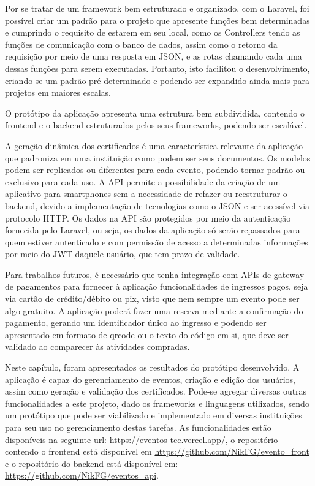 Por se tratar de um framework bem estruturado e organizado, com o Laravel, foi possível criar um padrão para o projeto que apresente funções bem determinadas e cumprindo o requisito de estarem em seu local, como os Controllers tendo as funções de comunicação com o banco de dados, assim como o retorno da requisição por meio de uma resposta em JSON, e as rotas chamando cada uma dessas funções para serem executadas. Portanto, isto facilitou o desenvolvimento, criando-se um padrão pré-determinado e podendo ser expandido ainda mais para projetos em maiores escalas.

O protótipo da aplicação apresenta uma estrutura bem subdividida, contendo o frontend e o backend estruturados pelos seus frameworks, podendo ser escalável.

A geração dinâmica dos certificados é uma característica relevante da aplicação que padroniza em uma instituição como podem ser seus documentos. Os modelos podem ser replicados ou diferentes para cada evento, podendo tornar padrão ou exclusivo para cada uso. A API permite a possibilidade da criação de um aplicativo para smartphones sem a necessidade de refazer ou reestruturar o backend, devido a implementação de tecnologias como o JSON e ser acessível via protocolo HTTP. Os dados na API são protegidos por meio da autenticação fornecida pelo Laravel, ou seja, os dados da aplicação só serão repassados para quem estiver autenticado e com permissão de acesso a determinadas informações por meio do JWT daquele usuário, que tem prazo de validade. 

Para trabalhos futuros, é necessário que tenha integração com APIs de gateway de pagamentos para fornecer à aplicação funcionalidades de ingressos pagos, seja via cartão de crédito/débito ou pix, visto que nem sempre um evento pode ser algo gratuito. A aplicação poderá fazer uma reserva mediante a confirmação do pagamento, gerando um identificador único ao ingresso e podendo ser apresentado em formato de qrcode ou o texto do código em si, que deve ser validado ao comparecer às atividades compradas. 

Neste capítulo, foram apresentados os resultados do protótipo desenvolvido. A aplicação é capaz do gerenciamento de eventos, criação e edição dos usuários, assim como geração e validação dos certificados. Pode-se agregar diversas outras funcionalidades a este projeto, dado os frameworks e linguagens utilizados, sendo um protótipo que pode ser viabilizado e implementado em diversas instituições para seu uso no gerenciamento destas tarefas. As funcionalidades estão disponíveis na seguinte url: \url{https://eventos-tcc.vercel.app/}, o repositório contendo o frontend está disponível em \url{https://github.com/NikFG/evento_front} e o repositório do backend está disponível em: \url{https://github.com/NikFG/eventos_api}.
